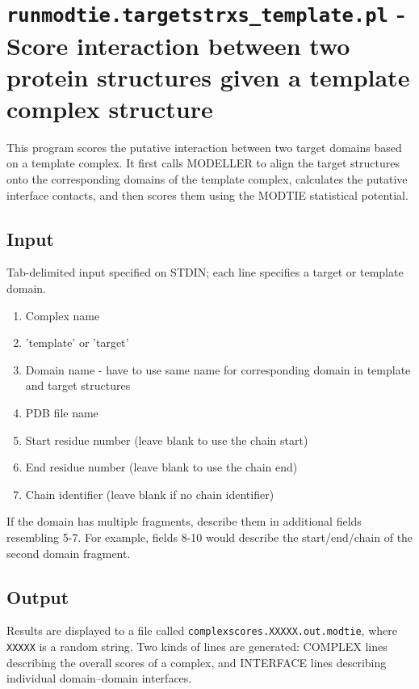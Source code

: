 \documentclass[11pt]{article}
\begin{document}
\section{{\tt runmodtie.targetstrxs\_template.pl} - Score interaction between two protein structures given a template complex structure}

This program scores the putative interaction between two target domains based on a template complex. It first calls MODELLER to align the target structures onto the corresponding domains of the template complex, calculates the putative interface contacts, and then scores them using the MODTIE statistical potential.

\subsection{Input}

Tab-delimited input specified on STDIN; each line specifies a target or template domain.
\begin{enumerate}
   \item Complex name
   \item 'template' or 'target'
   \item Domain name - have to use same name for corresponding domain in template and target structures
   \item PDB file name
   \item Start residue number (leave blank to use the chain start)
   \item End residue number (leave blank to use the chain end)
   \item Chain identifier (leave blank if no chain identifier)
\end{enumerate}

If the domain has multiple fragments, describe them in additional fields resembling 5-7. For example, fields 8-10 would describe the start/end/chain of the second domain fragment.

\subsection{Output}

Results are displayed to a file called {\tt complexscores.XXXXX.out.modtie}, where {\tt XXXXX} is a random string. Two kinds of lines are generated: COMPLEX lines describing the overall scores of a complex, and INTERFACE lines describing individual domain--domain interfaces.\\
\end{document}
